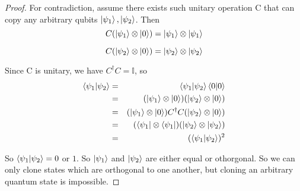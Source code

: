 \begin{proof} \cite{Wehner:notes}
For contradiction, assume there exists such unitary operation C that can copy any arbitrary qubits $\ket{\psi_1}, \ket{\psi_2}$. Then
\begin{equation*}
    C(\ket{\psi_1} \otimes \ket{0})=\ket{\psi_1} \otimes \ket{\psi_1}
\end{equation*}

\begin{equation*}
C(\ket{\psi_2} \otimes \ket{0})=\ket{\psi_2} \otimes \ket{\psi_2}  
\end{equation*}
    

Since C is unitary, we have $C^\dagger C=\mathbb{I}$, so
\begin{eqnarray*}
\braket{\psi_1|\psi_2}&=&\braket{\psi_1|\psi_2}\braket{0|0}\\
&=&(\ket{\psi_1} \otimes \ket{0})(\ket{\psi_2} \otimes \ket{0})\\
&=&(\ket{\psi_1} \otimes \ket{0})C^\dagger C(\ket{\psi_2} \otimes \ket{0})\\
&=&(\bra{\psi_1} \otimes \bra{\psi_1})(\ket{\psi_2} \otimes \ket{\psi_2})\\
&=&(\braket{\psi_1 |\psi_2})^2
\end{eqnarray*}

So $\braket{\psi_1 | \psi_2}=0$ or $1$. So $\ket{\psi_1}$ and $\ket{\psi_2}$ are either equal or othorgonal. So we can only clone states which are orthogonal to one another, but cloning an arbitrary quantum state is impossible. 
\end{proof}